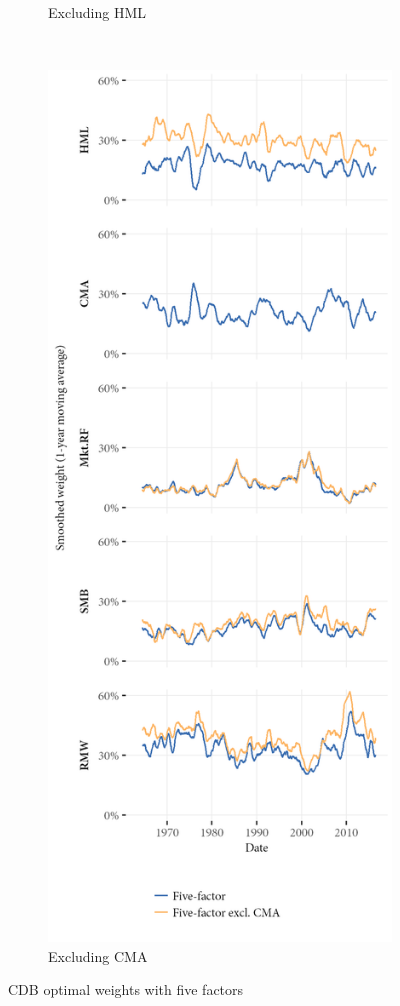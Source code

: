 \begin{figure}[htbp]
\begin{subfigure}{0.45\textwidth}
    \caption{Excluding HML}
  \end{subfigure}
  ~
  \begin{subfigure}{0.45\textwidth}
    \includegraphics[width=\textwidth]{graphics/weights/appendix_Weights_CDB_5F_EXCL_CMA_5F.png}
    \caption{Excluding CMA}
  \end{subfigure}  
  \caption{CDB optimal weights with five factors}
  \label{fig:cdb_optimal_5}


\end{figure}
